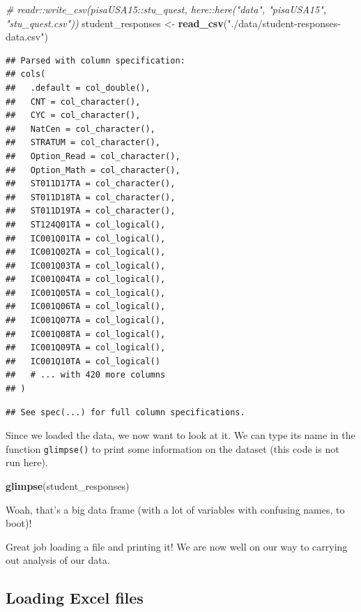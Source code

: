 \documentclass[]{book}
\newenvironment{Shaded}{\begin{snugshade}}{\end{snugshade}}
\newcommand{\KeywordTok}[1]{\textcolor[rgb]{0.13,0.29,0.53}{\textbf{#1}}}
\newcommand{\StringTok}[1]{\textcolor[rgb]{0.31,0.60,0.02}{#1}}
\newcommand{\CommentTok}[1]{\textcolor[rgb]{0.56,0.35,0.01}{\textit{#1}}}
\newcommand{\NormalTok}[1]{#1}
\begin{document}
\begin{Shaded}
\begin{Highlighting}[]
\CommentTok{# readr::write_csv(pisaUSA15::stu_quest, here::here("data", "pisaUSA15", "stu_quest.csv"))}
\NormalTok{student_responses <-}
\StringTok{    }\KeywordTok{read_csv}\NormalTok{(}\StringTok{"./data/student-responses-data.csv"}\NormalTok{)}
\end{Highlighting}
\end{Shaded}

\begin{verbatim}
## Parsed with column specification:
## cols(
##   .default = col_double(),
##   CNT = col_character(),
##   CYC = col_character(),
##   NatCen = col_character(),
##   STRATUM = col_character(),
##   Option_Read = col_character(),
##   Option_Math = col_character(),
##   ST011D17TA = col_character(),
##   ST011D18TA = col_character(),
##   ST011D19TA = col_character(),
##   ST124Q01TA = col_logical(),
##   IC001Q01TA = col_logical(),
##   IC001Q02TA = col_logical(),
##   IC001Q03TA = col_logical(),
##   IC001Q04TA = col_logical(),
##   IC001Q05TA = col_logical(),
##   IC001Q06TA = col_logical(),
##   IC001Q07TA = col_logical(),
##   IC001Q08TA = col_logical(),
##   IC001Q09TA = col_logical(),
##   IC001Q10TA = col_logical()
##   # ... with 420 more columns
## )
\end{verbatim}

\begin{verbatim}
## See spec(...) for full column specifications.
\end{verbatim}

Since we loaded the data, we now want to look at it. We can type its
name in the function \texttt{glimpse()} to print some information on the
dataset (this code is not run here).

\begin{Shaded}
\begin{Highlighting}[]
\KeywordTok{glimpse}\NormalTok{(student_responses)}
\end{Highlighting}
\end{Shaded}

Woah, that's a big data frame (with a lot of variables with confusing
names, to boot)!

Great job loading a file and printing it! We are now well on our way to
carrying out analysis of our data.

\subsection{Loading Excel files}\label{loading-excel-files}
\end{document}
